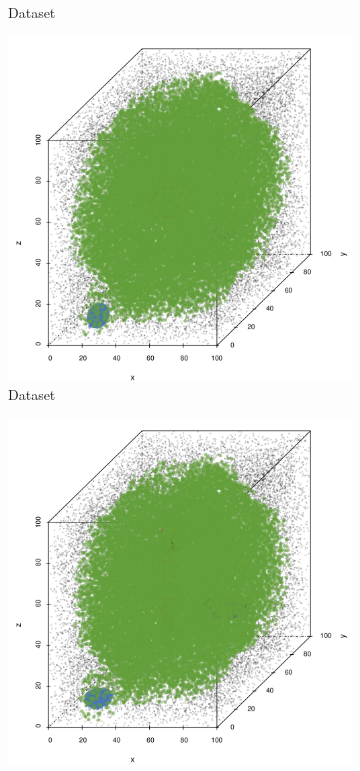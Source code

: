 \begin{figure}
\begin{subfigure}{0.23\textwidth}
				\caption{Dataset \baakmanTwo}
				\label{fig:discussion:performance:mbeLowerError:baakman2}
			\end{subfigure}	
			\begin{subfigure}{0.23\textwidth}
				\centering
				\includegraphics[keepaspectratio=true, width=\textwidth, height=0.23\textheight]{discussion/img/ferdosi_3_abs_error_mbeSmallerThansambe}
				\caption{Dataset \ferdosiThree}
				\label{fig:discussion:performance:mbeLowerError:ferdosi3}
			\end{subfigure}
			\begin{subfigure}{0.23\textwidth}
				\centering
				\includegraphics[keepaspectratio=true, width=\textwidth, height=0.23\textheight]{discussion/img/baakman_3_abs_error_mbeSmallerThansambe}

\end{subfigure}
\end{figure}
